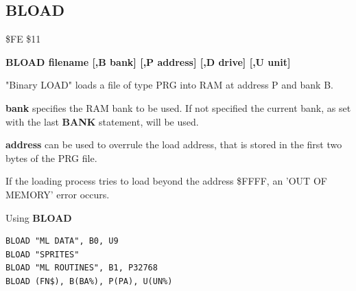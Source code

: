 \subsection{BLOAD}
\begin{description}[leftmargin=2cm,style=nextline]
\item [Token:] \$FE \$11
\item [Format:] {\bf BLOAD filename [,B bank]
                [,P address]  [,D drive] [,U unit] }
\item [Usage:]
   "Binary LOAD" loads a file of type
   PRG into RAM at address P and bank B.

   \filenamedefinition

   {\bf bank} specifies the RAM bank to be used.
   If not specified the current bank, as set with the last
   {\bf BANK} statement, will be used.

   {\bf address} can be used to overrule the load address,
   that is stored in the first two bytes of the PRG file.

   \drivedefinition

   \unitdefinition

\item [Remarks:]
   If the loading process tries to load beyond the address \$FFFF,
   an 'OUT OF MEMORY' error occurs.

\item [Example:] Using {\bf BLOAD}
\begin{tcolorbox}[colback=black,coltext=white]
\verbatimfont{\codefont}
\begin{verbatim}
BLOAD "ML DATA", B0, U9
BLOAD "SPRITES"
BLOAD "ML ROUTINES", B1, P32768
BLOAD (FN$), B(BA%), P(PA), U(UN%)
\end{verbatim}
\end{tcolorbox}
\end{description}


\newpage
